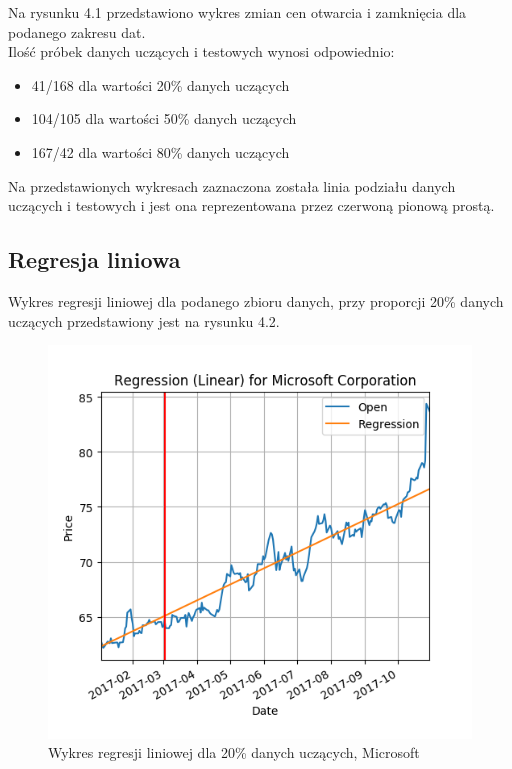Na rysunku 4.1 przedstawiono wykres zmian cen otwarcia i zamknięcia dla podanego zakresu dat.\\ 

Ilość próbek danych uczących i testowych wynosi odpowiednio:
\begin{itemize}
 \item 41/168 dla wartości 20\% danych uczących
 \item 104/105 dla wartości 50\% danych uczących
 \item 167/42 dla wartości 80\% danych uczących
\end{itemize}
Na przedstawionych wykresach zaznaczona została linia podziału danych uczących i testowych i jest ona reprezentowana przez czerwoną pionową prostą.

\subsection{Regresja liniowa}
Wykres regresji liniowej dla podanego zbioru danych, przy proporcji 20\% danych uczących przedstawiony jest na rysunku 4.2.\\

\begin{figure}[h!]
\centering
\includegraphics[width=150mm]{pictures/plots/microsoft_linear_20.png}
\caption{Wykres regresji liniowej dla 20\% danych uczących, Microsoft}
\label{fig:Wykres regresji liniowej dla 20\% danych uczących, Microsoft}
\end{figure}


